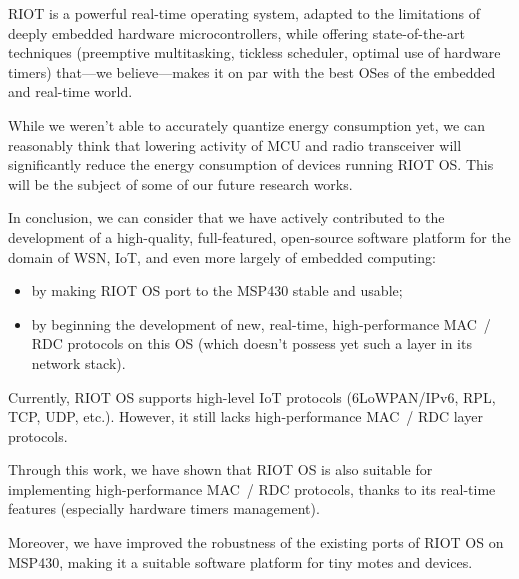 \documentclass[a4paper,twoside]{article}
\begin{document}
RIOT is a powerful real-time operating system, adapted to the limitations
of deeply embedded hardware microcontrollers, while offering state-of-the-art
techniques (preemptive multitasking, tickless scheduler, optimal use
of hardware timers) that---we believe---makes it on par with
the best OSes of the embedded and real-time world.

While we weren't able to accurately quantize energy consumption
yet, we can reasonably think that lowering activity of MCU and radio
transceiver will significantly reduce the energy consumption of devices
running RIOT OS. This will be the subject of some of our future
research works.

\bigskip

In conclusion, we can consider that we have actively contributed to the
development of a high-quality, full-featured, open-source software platform
for the domain of WSN, IoT, and even more largely of embedded computing:

\begin{itemize}

\item by making RIOT OS port to the MSP430 stable and usable;

\item by beginning the development of new, real-time, high-performance
      MAC~/ RDC protocols on this OS (which doesn't possess yet such
      a layer in its network stack).

\end{itemize}

Currently, RIOT OS supports high-level IoT protocols (6LoWPAN/IPv6, RPL,
TCP, UDP, etc.). However, it still lacks high-performance MAC~/ RDC layer
protocols.

Through this work, we have shown that RIOT OS is also suitable for
implementing high-performance MAC~/ RDC protocols, thanks to its real-time
features (especially hardware timers management).

Moreover, we have improved the robustness of the existing ports of RIOT OS
on MSP430, making it a suitable software platform for tiny motes and devices.






\vfill

{\small
}
\end{document}
